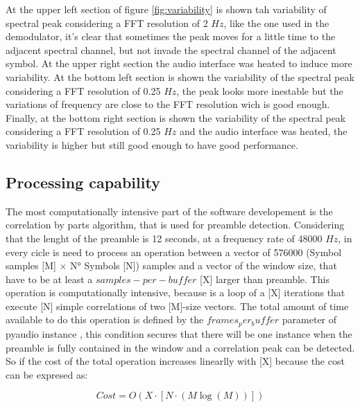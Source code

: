 At the upper left section of figure \ref{fig:variability} is shown tah variability of spectral peak considering a FFT resolution of 2 $Hz$, like the one used in the demodulator, it's clear that sometimes the peak moves for a little time to the adjacent spectral channel, but not invade the spectral channel of the adjacent symbol. At the upper right section the audio interface was heated to induce more variability. At the bottom left section is shown the variability of the spectral peak considering a FFT resolution of 0.25 $Hz$, the peak looks more inestable but the variations of frequency are close to the FFT resolution wich is good enough. Finally, at the bottom right section is shown the variability of the spectral peak considering a FFT resolution of 0.25 $Hz$ and the audio interface was heated, the variability is higher but still good enough to have good performance.

\subsection{Processing capability}

The most computationally intensive part of the software developement is the correlation by parts algorithm, that is used for preamble detection. Considering that the lenght of the preamble is 12 seconds, at a frequency rate of 48000 $Hz$, in every cicle is need to process an operation between a vector of 576000  (Symbol samples [M] $\times$ N° Symbols [N]) samples and a vector of the window size, that have to be at least a $samples-per-buffer$ [X] larger than preamble. This operation is computationally intensive, because is a loop of a [X] iterations that execute [N] simple correlations of two [M]-size vectors. The total amount of time available to do this operation is defined by the $frames_per_buffer$ parameter of pyaudio instance \cite{mitPyAudioDocumentation}, this condition secures that there will be one instance when the preamble is fully contained in the window and a correlation peak can be detected. 
\newp
So if the cost of the total operation increases linearlly with [X] because the cost can be expresed as:

\begin{equation}
    Cost = O(X \cdot [N \cdot (M\log(M))])
    \end{equation}

